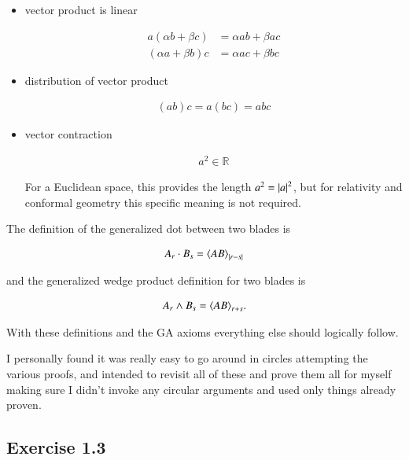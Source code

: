 \begin{itemize}
\item vector product is linear

\begin{align}
a ( \alpha b + \beta c) &= \alpha a b + \beta a c \\
( \alpha a + \beta b) c &= \alpha a c + \beta b c
\end{align}

\item distribution of vector product

\begin{align}
(a b) c = a (b c) = a b c
\end{align}

\item vector contraction

\begin{align}\label{eqn:nfcm_ch2:contractionAxiom}
a^2 \in \mathbb{R}
\end{align}

For a Euclidean space, this provides the length $a^2 = \left\lvert{a}\right\rvert^2$, but for relativity and conformal geometry this specific meaning is not required.

\end{itemize}

The definition of the generalized dot between two blades is

\begin{align}\label{eqn:nfcm_ch2:generalDot}
A_r \cdot B_s = {\left\langle{{A B}}\right\rangle}_{{\left\lvert{r -s}\right\rvert}}
\end{align}

and the generalized wedge product definition for two blades is 

\begin{align}\label{eqn:nfcm_ch2:generalWedge}
A_r \wedge B_s = {\left\langle{{A B}}\right\rangle}_{r + s}.
\end{align}

With these definitions and the GA axioms everything else should logically follow.

I personally found it was really easy to go around in circles attempting the various proofs, and intended to revisit all of these
and prove them all for myself making sure I didn't invoke any circular arguments and used only things already proven.

\subsection{Exercise 1.3 }

